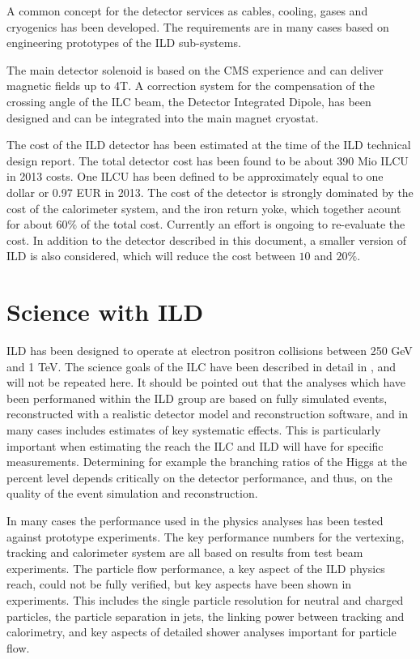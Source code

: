 \documentclass[%
 amsmath,amssymb,
 aps,
]{revtex4-1}
\begin{document}
A common concept for the detector services as cables, cooling, gases and cryogenics has been developed. The requirements are in many cases based on engineering prototypes of the ILD sub-systems. 

The main detector solenoid is based on the CMS experience and can deliver magnetic fields up to 4T. A correction system for the compensation of the crossing angle of the ILC beam, the Detector Integrated Dipole, has been designed and can be integrated into the main magnet cryostat.

The cost of the ILD detector has been estimated at the time of the ILD technical design report. The total detector cost has been found to be about $390 $ Mio ILCU in 2013 costs. One ILCU has been defined to be approximately equal to one dollar or 0.97 EUR in 2013. The cost of the detector is strongly dominated by the cost of the calorimeter system, and the iron return yoke, which together acount for about $60\%$ of the total cost. Currently an effort is ongoing to re-evaluate the cost. In addition to the detector described in this document, a smaller version of ILD is also considered, which will reduce the cost between $10$ and $20\%$. 

\section{Science with ILD}
ILD has been designed to operate at electron positron collisions between 250 GeV and 1 TeV. The science goals of the ILC have been described in detail in \cite{ILCESU1}, and will not be repeated here. It should be pointed out that the analyses which have been performaned within the ILD group are based on fully simulated events, reconstructed with a realistic detector model and reconstruction software, and in many cases includes estimates of key systematic effects. This is particularly important when estimating the reach the ILC and ILD will have for specific measurements. Determining for example the branching ratios of the Higgs at the percent level depends critically on the detector performance, and thus, on the quality of the event simulation and reconstruction. 

In many cases the performance used in the physics analyses has been tested against prototype experiments. The key performance numbers for the vertexing, tracking and calorimeter system are all based on results from test beam experiments. The particle flow performance, a key aspect of the ILD physics reach, could not be fully verified, but key aspects have been shown in experiments. This includes the single particle resolution for neutral and charged particles, the particle separation in jets, the linking power between tracking and calorimetry, and key aspects of detailed shower analyses important for particle flow. 
\end{document}
